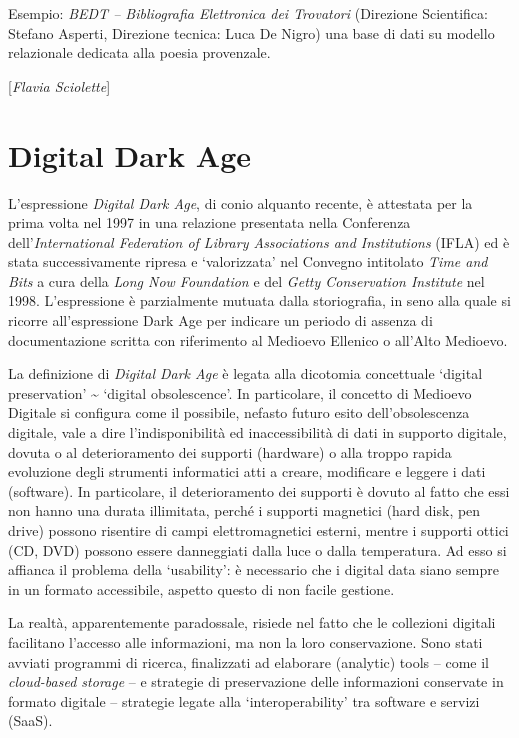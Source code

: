 {Esempio: \emph{BEDT -- Bibliografia Elettronica dei Trovatori}
(Direzione Scientifica: Stefano Asperti, Direzione tecnica: Luca De
Nigro) una base di dati su modello relazionale dedicata alla poesia
provenzale.

\hrulefill 

{[}\emph{Flavia Sciolette}{]}

\chapter{Digital Dark Age}

L'espressione \emph{Digital Dark Age}, di conio alquanto recente, è
attestata per la prima volta nel 1997 in una relazione presentata nella
Conferenza dell'\emph{International Federation of Library Associations
and Institutions} (IFLA) ed è stata successivamente ripresa e
`valorizzata' nel Convegno intitolato \emph{Time and Bits} a cura della
\emph{Long Now Foundation} e del \emph{Getty Conservation Institute} nel
1998. L'espressione è parzialmente mutuata dalla storiografia, in seno
alla quale si ricorre all'espressione Dark Age per indicare un periodo
di assenza di documentazione scritta con riferimento al Medioevo
Ellenico o all'Alto Medioevo.

La definizione di \emph{Digital Dark Age} è legata alla dicotomia
concettuale `digital preservation' \textasciitilde{} `digital
obsolescence'. In particolare, il concetto di Medioevo Digitale si
configura come il possibile, nefasto futuro esito dell'obsolescenza
digitale, vale a dire l'indisponibilità ed inaccessibilità di dati in
supporto digitale, dovuta o al deterioramento dei supporti (hardware) o
alla troppo rapida evoluzione degli strumenti informatici atti a creare,
modificare e leggere i dati (software). In particolare, il
deterioramento dei supporti è dovuto al fatto che essi non hanno una
durata illimitata, perché i supporti magnetici (hard disk, pen drive)
possono risentire di campi elettromagnetici esterni, mentre i supporti
ottici (CD, DVD) possono essere danneggiati dalla luce o dalla
temperatura. Ad esso si affianca il problema della `usability': è
necessario che i digital data siano sempre in un formato accessibile,
aspetto questo di non facile gestione.

La realtà, apparentemente paradossale, risiede nel fatto che le
collezioni digitali facilitano l'accesso alle informazioni, ma non la
loro conservazione. Sono stati avviati programmi di ricerca, finalizzati
ad elaborare (analytic) tools -- come il \emph{cloud-based storage} -- e
strategie di preservazione delle informazioni conservate in formato
digitale -- strategie legate alla `interoperability' tra software e
servizi (SaaS).

}
